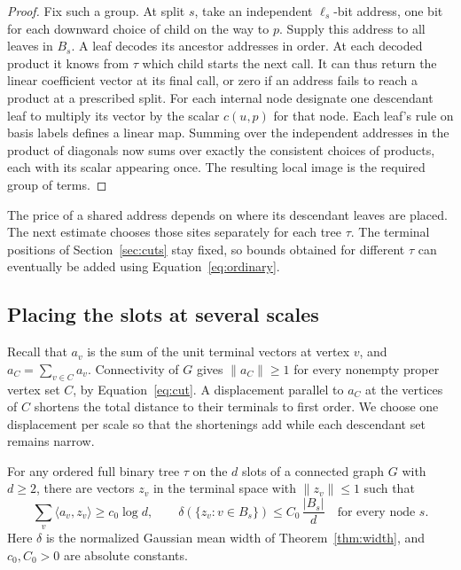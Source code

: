 \begin{proof}
Fix such a group. At split $s$, take an independent $\ell_s$-bit
address, one bit for each downward choice of child on the way to $p$.
Supply this address to all leaves in $B_s$. A leaf decodes its
ancestor addresses in order. At each decoded product it knows from
$\tau$ which child starts the next call. It can thus return the
linear coefficient vector at its final call, or zero if an address
fails to reach a product at a prescribed split.
For each internal node designate one descendant leaf to multiply its
vector by the scalar $c(u,p)$ for that node. Each leaf's rule on
basis labels defines a linear map. Summing over the independent
addresses in the product of diagonals now sums over exactly the
consistent choices of products, each with its scalar appearing once.
The resulting local image is the required group of terms.
\end{proof}

The price of a shared address depends on where its descendant leaves
are placed. The next estimate chooses those sites separately for each
tree $\tau$. The terminal positions of Section~\ref{sec:cuts} stay
fixed, so bounds obtained for different $\tau$ can eventually be added
using Equation~\eqref{eq:ordinary}.

\subsection{Placing the slots at several scales}

Recall that $a_v$ is the sum of the unit terminal vectors at vertex
$v$, and $a_C=\sum_{v\in C}a_v$. Connectivity of $G$ gives
$\|a_C\|\ge1$ for every nonempty proper vertex set $C$, by
Equation~\eqref{eq:cut}. A displacement parallel to $a_C$ at the
vertices of $C$ shortens the total distance to their terminals to
first order. We choose one displacement per scale so that the
shortenings add while each descendant set remains narrow.

\begin{lemma}\label{lem:formula-placement}
For any ordered full binary tree $\tau$ on the $d$ slots of a connected
graph $G$ with $d\ge2$, there are vectors $z_v$ in the terminal space
with $\|z_v\|\le1$ such that
\[
       \sum_v\langle a_v,z_v\rangle\ge c_0\log d,
       \qquad
       \delta(\{z_v:v\in B_s\})\le C_0\,\frac{|B_s|}{d}
       \quad\text{for every node }s .
\]
Here $\delta$ is the normalized Gaussian mean width of
Theorem~\ref{thm:width}, and $c_0,C_0>0$ are absolute constants.
\end{lemma}

